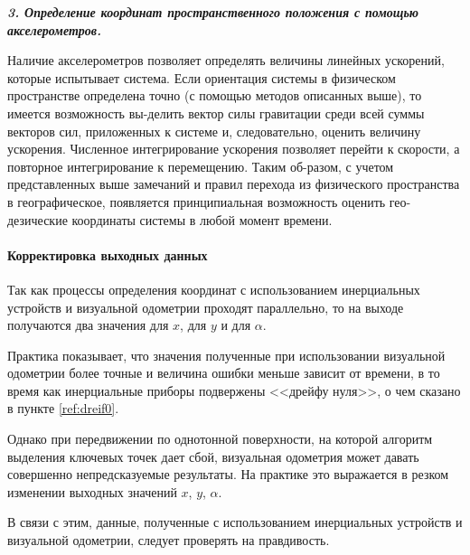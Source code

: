 \textit{\textbf{3. Определение координат пространственного положения с помощью акселерометров.}}

Наличие акселерометров позволяет определять величины линейных ускорений, которые испытывает система. Если ориентация системы в физическом пространстве определена точно (с помощью методов описанных выше), то имеется возможность вы-делить вектор силы гравитации среди всей суммы векторов сил, приложенных к системе и, следовательно, оценить величину ускорения. Численное интегрирование ускорения позволяет перейти к скорости, а повторное интегрирование к перемещению. Таким об-разом, с учетом представленных выше замечаний и правил перехода из физического пространства в географическое, появляется принципиальная возможность оценить гео-дезические координаты системы в любой момент времени.

\paragraph{Корректировка выходных данных}
\label{item:outputCorrect}
Так как процессы определения координат с использованием инерциальных устройств и визуальной одометрии проходят параллельно, то на выходе получаются два значения для $x$, для $y$ и для $\alpha$.  

Практика показывает, что значения полученные при использовании визуальной одометрии более точные и величина ошибки меньше зависит от времени, в то время как инерциальные приборы подвержены <<дрейфу нуля>>, о чем сказано в пункте \ref{ref:dreif0}.

Однако при передвижении по однотонной поверхности, на которой алгоритм выделения ключевых точек дает сбой, визуальная одометрия может давать совершенно непредсказуемые результаты. На практике это выражается в резком изменении выходных значений $x$, $y$, $\alpha$. 

В связи с этим, данные, полученные с использованием инерциальных устройств и визуальной одометрии, следует проверять на правдивость. 

